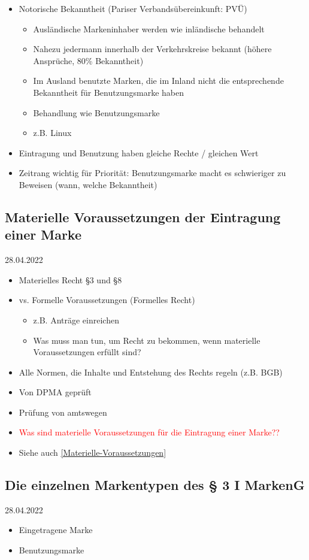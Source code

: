\documentclass{report}
\begin{document}
\begin{itemize}
	\item Notorische Bekanntheit (Pariser Verbandsübereinkunft: PVÜ)
	\begin{itemize}
		\item Ausländische Markeninhaber werden wie inländische behandelt
		\item Nahezu jedermann innerhalb der Verkehrskreise bekannt (höhere Ansprüche, 80\% Bekanntheit)
		\item Im Ausland benutzte Marken, die im Inland nicht die entsprechende Bekanntheit für Benutzungsmarke haben
		\item Behandlung wie Benutzungsmarke
		\item z.B. Linux
	\end{itemize}
	\item Eintragung und Benutzung haben gleiche Rechte / gleichen Wert
	\item Zeitrang wichtig für Priorität: Benutzungsmarke macht es schwieriger zu Beweisen (wann, welche Bekanntheit)
\end{itemize}

\subsection{Materielle Voraussetzungen der Eintragung einer Marke}
28.04.2022
\begin{itemize}
	\item Materielles Recht §3 und §8
	\item vs. Formelle Voraussetzungen (Formelles Recht)
	\begin{itemize}
		\item z.B. Anträge einreichen
		\item Was muss man tun, um Recht zu bekommen, wenn materielle Voraussetzungen erfüllt sind?
	\end{itemize}
	\item Alle Normen, die Inhalte und Entstehung des Rechts regeln (z.B. BGB)
	\item Von DPMA geprüft
	\item Prüfung von amtswegen
	\item \textcolor{red}{Was sind materielle Voraussetzungen für die Eintragung einer Marke??}
	\item Siehe auch \ref{Materielle-Voraussetzungen}
\end{itemize}

\subsection{Die einzelnen Markentypen des § 3 I MarkenG}
28.04.2022
\begin{itemize}
	\item Eingetragene Marke
	\item Benutzungsmarke
\end{itemize}
\end{document}
